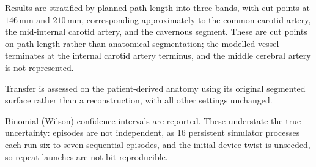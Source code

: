 Results are stratified by planned-path length into three bands, with cut points at $146$\,mm and
$210$\,mm, corresponding approximately to the common carotid artery, the mid-internal carotid
artery, and the cavernous segment. These are cut points on path length rather than anatomical
segmentation; the modelled vessel terminates at the internal carotid artery terminus, and the
middle cerebral artery is not represented.

Transfer is assessed on the patient-derived anatomy using its original segmented surface rather
than a reconstruction, with all other settings unchanged.

Binomial (Wilson) confidence intervals are reported. These understate the true uncertainty:
episodes are not independent, as 16 persistent simulator processes each run six to seven
sequential episodes, and the initial device twist is unseeded, so repeat launches are not
bit-reproducible.
